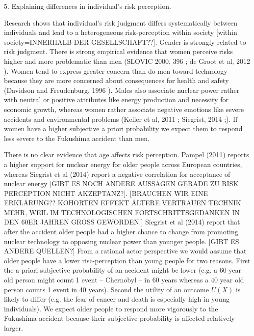      
5. Explaining differences in individual's risk perception. 

Research shows that  individual's risk judgment differs systematically between individuals and lead to a heterogeneous risk-perception within society [within society=INNERHALB DER GESELLSCHAFT??]. Gender is strongly related to risk judgment. There is strong empirical evidence that women perceive risks higher and more problematic than men (SLOVIC 2000, 396 \citep[396]{Slovic:2000tx}; de Groot et al, 2012 \citep{deGroot:2012fg}). Women tend to express greater concern than do men toward technology because they are more concerned about consequences for health and safety (Davidson and Freudenburg, 1996 \citep{Davidson:1996uk}).  Males also associate nuclear power rather with neutral or positive attributes like energy production and necessity for economic growth, whereas women rather associate negative emotions like severe accidents and environmental problems (Keller et al, 2011 \citep{Keller:2011gb}; Siegrist, 2014 \citep{Siegrist:2014ji};). If women have a higher subjective a priori probability we expect them to respond less severe to the Fukushima accident than men.

There is no clear evidence that age affects risk perception. Pampel (2011) \citep{Pampel:2011cx} reports a higher support for nuclear energy for older people across European countries, whereas Siegrist et al (2014) report a negative correlation for acceptance of nuclear energy [GIBT ES NOCH ANDERE AUSSAGEN GERADE ZU RISK PERCEPTION NICHT AKZEPTANZ?]. [BRAUCHEN WIR EINE ERKLÄRUNG?? KOHORTEN EFFEKT ÄLTERE VERTRAUEN TECHNIK MEHR, WEIL IM TECHNOLOGISCHEN FORTSCHRITTSGEDANKEN IN DEN 60ER JAHREN GROSS GEWORDEN.] Siegrist et al (2014) \citep{Siegrist:2014ji} report that after the accident older people had a higher chance to change from promoting nuclear technology to opposing nuclear power than younger people.  [GIBT ES ANDERE QUELLEN?] From a rational actor perspective we would assume that older people have a lower risc-perception than young people for two reasons.  First the a priori subjective probability of an accident might be lower (e.g. a 60 year old person might count 1 event -- Chernobyl -- in 60 years whereas a 40 year old person counts 1 event in 40 years). Second the utility of an outcome $U(X)$ is likely to differ (e.g. the fear of cancer and death is especially high in young individuals). We expect older people to respond more vigorously to the Fukushima accident because their subjective probability is affected relatively larger.
                      

